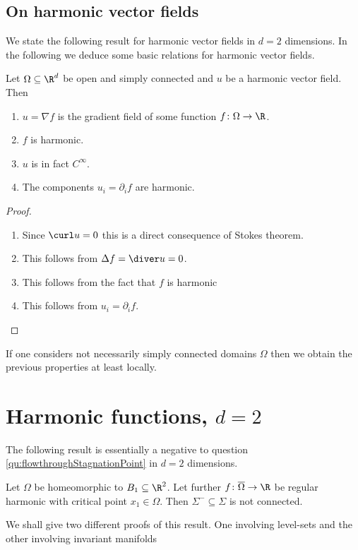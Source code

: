 \subsection{On harmonic vector fields}

We state the following result for harmonic vector fields in $d=2$ dimensions.
In the following we deduce some basic relations for harmonic vector fields.
\begin{proposition}\label{pr:n2:hvf:simplyConnected}
  Let $\Omega\subseteq\R^d$ be open and simply connected and $u$ be a harmonic vector field. Then
  \begin{enumerate}
    \item 
    $u=\nabla f$ is the gradient field of some
    function $f\colon\Omega\to\R$.
    \item  $f$ is harmonic.
    \item $u$ is in fact $C^\infty$.
    \item The components $u_i=\partial_if$ are harmonic.
  \end{enumerate}
\end{proposition}
\begin{proof}
  \begin{enumerate}
    \item 
    Since $\curl u =0$ this is a direct consequence of Stokes theorem.
    \item This follows from $\Delta f = \diver u=0$.
    \item This follows from the fact that $f$ is harmonic
    \item This follows from $u_i=\partial_if$.
  \end{enumerate}
\end{proof}

If one considers not necessarily simply connected domains $\Omega$ then we obtain the previous
properties at least locally.

\newpage

\section{Harmonic functions, $d=2$}

The following result is essentially a negative to question \ref{qu:flowthroughStagnationPoint} in $d=2$ dimensions.
\begin{proposition}\label{pr:n2:hf:nonExistence}
  Let $\Omega$ be homeomorphic to $B_1\subseteq\R^2$. Let further $f\colon\overline{\Omega}\to\R$ be regular harmonic  
  with critical point $x_1\in\Omega$. Then $\Sigma^-\subseteq\Sigma$ is not connected.
\end{proposition}
We shall give two different proofs of this result. One involving level-sets and the other involving invariant manifolds

